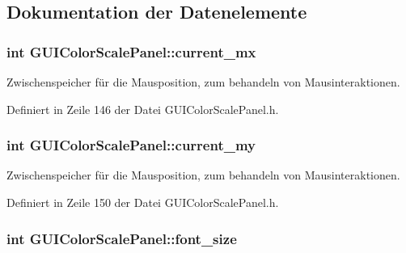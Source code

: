 \subsection{Dokumentation der Datenelemente}
\hypertarget{classGUIColorScalePanel_ab3da81e6c3cfb9122c0291584276a54d}{
\subsubsection[{current\-\_\-mx}]{\setlength{\rightskip}{0pt plus 5cm}int G\-U\-I\-Color\-Scale\-Panel\-::current\-\_\-mx\hspace{0.3cm}{\ttfamily [private]}}}\label{classGUIColorScalePanel_ab3da81e6c3cfb9122c0291584276a54d}


Zwischenspeicher für die Mausposition, zum behandeln von Mausinteraktionen. 



Definiert in Zeile 146 der Datei G\-U\-I\-Color\-Scale\-Panel.\-h.

\hypertarget{classGUIColorScalePanel_abb73679c805d8bcdd1ca0cb602887f84}{
\subsubsection[{current\-\_\-my}]{\setlength{\rightskip}{0pt plus 5cm}int G\-U\-I\-Color\-Scale\-Panel\-::current\-\_\-my\hspace{0.3cm}{\ttfamily [private]}}}\label{classGUIColorScalePanel_abb73679c805d8bcdd1ca0cb602887f84}


Zwischenspeicher für die Mausposition, zum behandeln von Mausinteraktionen. 



Definiert in Zeile 150 der Datei G\-U\-I\-Color\-Scale\-Panel.\-h.

\hypertarget{classGUIColorScalePanel_acd79c1dedc939040b03f54f21e78d72f}{
\subsubsection[{font\-\_\-size}]{\setlength{\rightskip}{0pt plus 5cm}int G\-U\-I\-Color\-Scale\-Panel\-::font\-\_\-size\hspace{0.3cm}{\ttfamily [private]}}}\label{classGUIColorScalePanel_acd79c1dedc939040b03f54f21e78d72f}


